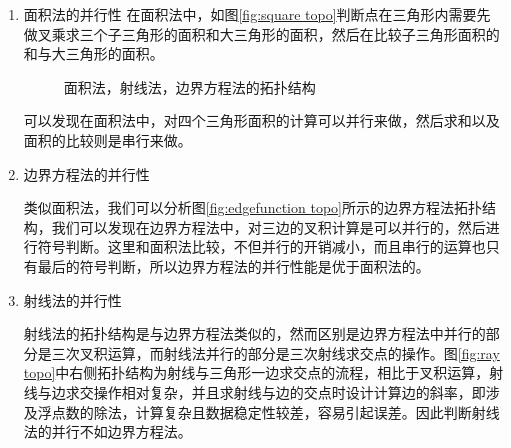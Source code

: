 \begin{enumerate}
\item 面积法的并行性
    在面积法中，如图\ref{fig:square topo}判断点在三角形内需要先做叉乘求三个子三角形的面积和大三角形的面积，然后在比较子三角形面积的和与大三角形的面积。
    
    \begin{figure}[hb]
        \centering
        \caption{面积法，射线法，边界方程法的拓扑结构}
    \end{figure}
    
    可以发现在面积法中，对四个三角形面积的计算可以并行来做，然后求和以及面积的比较则是串行来做。
    
\item 边界方程法的并行性
    

    类似面积法，我们可以分析图\ref{fig:edgefunction topo}所示的边界方程法拓扑结构，我们可以发现在边界方程法中，对三边的叉积计算是可以并行的，然后进行符号判断。这里和面积法比较，不但并行的开销减小，而且串行的运算也只有最后的符号判断，所以边界方程法的并行性能是优于面积法的。
    
    
\item 射线法的并行性
    
    射线法的拓扑结构是与边界方程法类似的，然而区别是边界方程法中并行的部分是三次叉积运算，而射线法并行的部分是三次射线求交点的操作。图\ref{fig:ray topo}中右侧拓扑结构为射线与三角形一边求交点的流程，相比于叉积运算，射线与边求交操作相对复杂，并且求射线与边的交点时设计计算边的斜率，即涉及浮点数的除法，计算复杂且数据稳定性较差，容易引起误差。因此判断射线法的并行不如边界方程法。
    

    
\end{enumerate}

